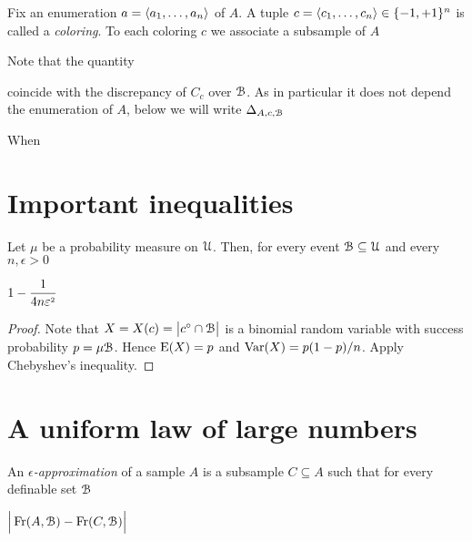 \documentclass[sputnik.tex]{subfiles}
\begin{document}
Fix an enumeration $a=\langle a_1,\dots,a_n\rangle$ of $A$. A tuple $c=\langle c_1,\dots,c_n\rangle\in\{-1,+1\}^n$ is called a \emph{coloring}. To each coloring $c$ we associate a subsample of $A$ 


Note that the quantity 


coincide with the discrepancy of $C_c$ over $\EuScript B$. As in particular it does not depend the enumeration of $A$, below we will write $\Delta_{A,c,\EuScript B}$

When 
\section{Important inequalities}


\def\ceq#1#2#3{\parbox[t]{15ex}{$\displaystyle #1$}\medrel{#2}{$\displaystyle #3$}}

\begin{void_thm}\label{wlln}
Let $\mu$ be a probability measure on $\EuScript U$.
Then, for every event $\EuScript B\subseteq\EuScript U$ and every $n,\epsilon>0$

\ceq{\hfill1-\frac{1}{4n\epsilon^{\scriptscriptstyle 2}}}{<}{\displaystyle\mu^n \Big(c\in\U^n\ :\ \Big|\mu\B - \frac1n\big|c^\circ\cap\B\big| \Big|\le\epsilon\Big)}
\end{void_thm}


\begin{proof}
Note that $X=X(c)=\big|c^\circ\cap\EuScript B\big|$ is a binomial random variable with success probability $p=\mu\EuScript B$. 
Hence ${\rm E}(X)=p$ and  ${\rm Var}(X)=p(1-p)/n$.
Apply Chebyshev's inequality.
\end{proof}


\section{A uniform law of large numbers}

\def\ceq#1#2#3{\parbox[t]{35ex}{$\displaystyle #1$}\medrel{#2}{$\displaystyle #3$}}

An \emph{$\epsilon$-approximation\/} of a sample $A$ is a subsample $C\subseteq A$ such that for every definable set $\EuScript B$

\ceq{\hfill\displaystyle \Big|\Fr(A,\B) - \Fr(C,\B)\Big|}{\le}{\epsilon}
\end{document}
